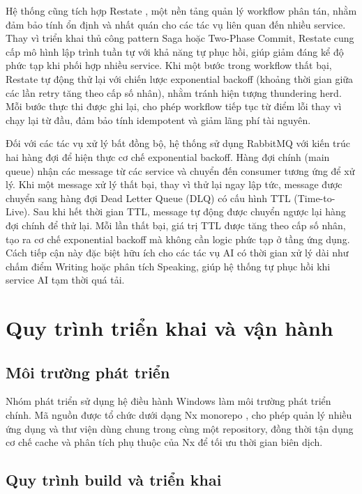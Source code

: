 Hệ thống cũng tích hợp Restate \cite{restate_docs}, một nền tảng quản lý workflow phân tán, nhằm đảm bảo tính ổn định và nhất quán cho các tác vụ liên quan đến nhiều service. Thay vì triển khai thủ công pattern Saga hoặc Two-Phase Commit, Restate cung cấp mô hình lập trình tuần tự với khả năng tự phục hồi, giúp giảm đáng kể độ phức tạp khi phối hợp nhiều service. Khi một bước trong workflow thất bại, Restate tự động thử lại với chiến lược exponential backoff (khoảng thời gian giữa các lần retry tăng theo cấp số nhân), nhằm tránh hiện tượng thundering herd. Mỗi bước thực thi được ghi lại, cho phép workflow tiếp tục từ điểm lỗi thay vì chạy lại từ đầu, đảm bảo tính idempotent và giảm lãng phí tài nguyên.

Đối với các tác vụ xử lý bất đồng bộ, hệ thống sử dụng RabbitMQ với kiến trúc hai hàng đợi để hiện thực cơ chế exponential backoff. Hàng đợi chính (main queue) nhận các message từ các service và chuyển đến consumer tương ứng để xử lý. Khi một message xử lý thất bại, thay vì thử lại ngay lập tức, message được chuyển sang hàng đợi Dead Letter Queue (DLQ) có cấu hình TTL (Time-to-Live). Sau khi hết thời gian TTL, message tự động được chuyển ngược lại hàng đợi chính để thử lại. Mỗi lần thất bại, giá trị TTL được tăng theo cấp số nhân, tạo ra cơ chế exponential backoff mà không cần logic phức tạp ở tầng ứng dụng. Cách tiếp cận này đặc biệt hữu ích cho các tác vụ AI có thời gian xử lý dài như chấm điểm Writing hoặc phân tích Speaking, giúp hệ thống tự phục hồi khi service AI tạm thời quá tải.

\section{Quy trình triển khai và vận hành}

\subsection{Môi trường phát triển}

Nhóm phát triển sử dụng hệ điều hành Windows làm môi trường phát triển chính. Mã nguồn được tổ chức dưới dạng Nx monorepo \cite{nx_monorepo}, cho phép quản lý nhiều ứng dụng và thư viện dùng chung trong cùng một repository, đồng thời tận dụng cơ chế cache và phân tích phụ thuộc của Nx để tối ưu thời gian biên dịch.

\subsection{Quy trình build và triển khai}

